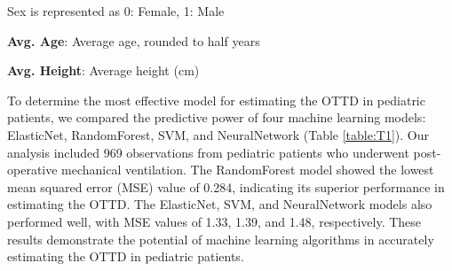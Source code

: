 \documentclass[11pt]{article}
\begin{document}
\begin{table}[h]
\caption{Summary statistics of age and height divided by sex}
\label{table:T0}
\begin{threeparttable}
\renewcommand{\TPTminimum}{\linewidth}
\begin{tablenotes}
\footnotesize
\item Sex is represented as 0: Female, 1: Male
\item \textbf{Avg. Age}: Average age, rounded to half years
\item \textbf{Avg. Height}: Average height (cm)
\end{tablenotes}
\end{threeparttable}
\end{table}


To determine the most effective model for estimating the OTTD in pediatric patients, we compared the predictive power of four machine learning models: ElasticNet, RandomForest, SVM, and NeuralNetwork (Table \ref{table:T1}). Our analysis included 969 observations from pediatric patients who underwent post-operative mechanical ventilation. The RandomForest model showed the lowest mean squared error (MSE) value of 0.284, indicating its superior performance in estimating the OTTD. The ElasticNet, SVM, and NeuralNetwork models also performed well, with MSE values of 1.33, 1.39, and 1.48, respectively. These results demonstrate the potential of machine learning algorithms in accurately estimating the OTTD in pediatric patients.
\end{document}
